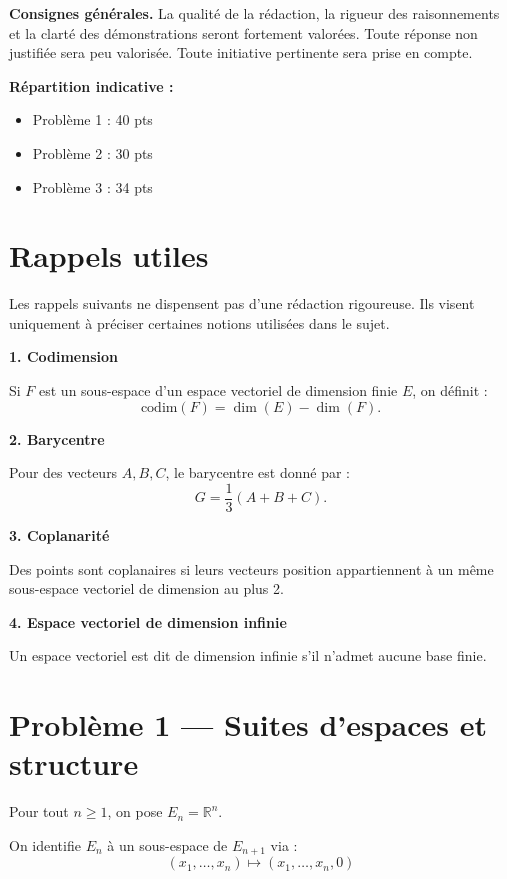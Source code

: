 \documentclass[11pt,a4paper]{article}
\begin{document}
\textbf{Consignes générales.} La qualité de la rédaction, la rigueur des raisonnements et la clarté des démonstrations seront fortement valorées.  
Toute réponse non justifiée sera peu valorisée.  
Toute initiative pertinente sera prise en compte.

\bigskip

\textbf{Répartition indicative :}

\begin{itemize}
\item Problème 1 : 40 pts
\item Problème 2 : 30 pts
\item Problème 3 : 34 pts
\end{itemize}

\bigskip
\section*{Rappels utiles}

Les rappels suivants ne dispensent pas d’une rédaction rigoureuse. Ils visent uniquement à préciser certaines notions utilisées dans le sujet.

\bigskip
\textbf{1. Codimension}

Si $F$ est un sous-espace d’un espace vectoriel de dimension finie $E$, on définit :
\[
\mathrm{codim}(F) = \dim(E) - \dim(F).
\]

\bigskip
\textbf{2. Barycentre}

Pour des vecteurs $A,B,C$, le barycentre est donné par :
\[
G = \frac{1}{3}(A + B + C).
\]

\bigskip

\textbf{3. Coplanarité}

Des points sont coplanaires si leurs vecteurs position appartiennent à un même sous-espace vectoriel de dimension au plus 2.

\bigskip

\textbf{4. Espace vectoriel de dimension infinie}

Un espace vectoriel est dit de dimension infinie s’il n’admet aucune base finie.
\bigskip

\section*{Problème 1 — Suites d’espaces et structure}

Pour tout $n \geq 1$, on pose $E_n = \mathbb{R}^n$.

On identifie $E_n$ à un sous-espace de $E_{n+1}$ via :
\[
(x_1,\dots,x_n) \mapsto (x_1,\dots,x_n,0)
\]
\end{document}
